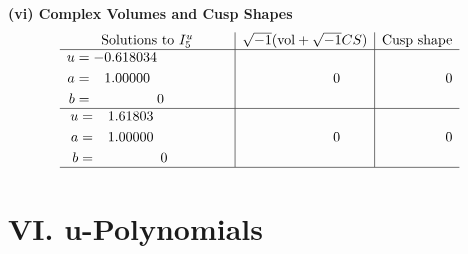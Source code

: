 \documentclass[1p]{elsarticle_modified}
\theoremstyle{definition}
\newcommand{\I}{\sqrt{-1}}
\begin{document}
\newpage\flushleft \textbf{(vi) Complex Volumes and Cusp Shapes}
$$\begin{array}{c|c|c}  
\text{Solutions to }I^u_{5}& \I (\text{vol} + \sqrt{-1}CS) & \text{Cusp shape}\\
 \hline 
\begin{aligned}
u &= -0.618034\phantom{ +0.000000I} \\
a &= \phantom{-}1.00000\phantom{ +0.000000I} \\
b &= \phantom{-0.000000 } 0\end{aligned}
 & \phantom{-0.000000 } 0 & \phantom{-0.000000 } 0 \\ \hline\begin{aligned}
u &= \phantom{-}1.61803\phantom{ +0.000000I} \\
a &= \phantom{-}1.00000\phantom{ +0.000000I} \\
b &= \phantom{-0.000000 } 0\end{aligned}
 & \phantom{-0.000000 } 0 & \phantom{-0.000000 } 0\\
 \hline 
 \end{array}$$\newpage
\newpage\renewcommand{\arraystretch}{1}
\centering \section*{ VI. u-Polynomials}
\end{document}
